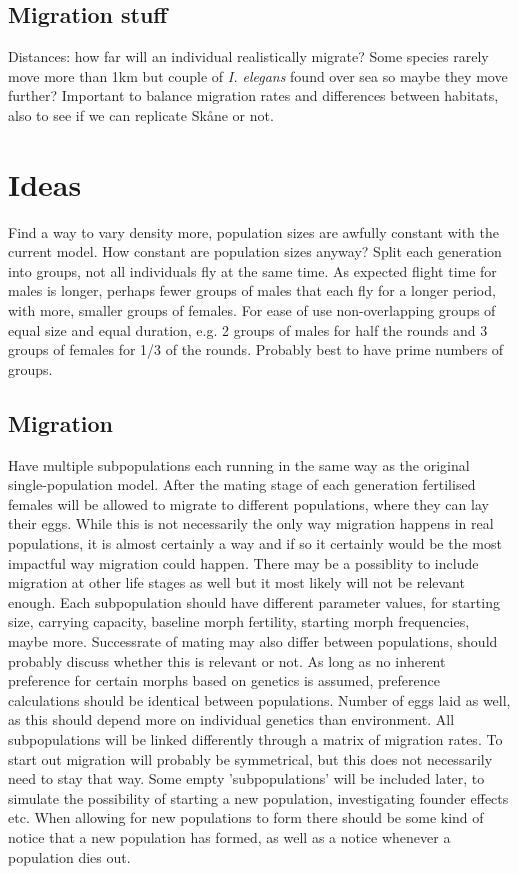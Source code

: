 \documentclass{article}
\begin{document}
\subsection{Migration stuff}
Distances: how far will an individual realistically migrate? Some species rarely move more than 1km but couple of \textit{I. elegans} found over sea so maybe they move further? Important to balance migration rates and differences between habitats, also to see if we can replicate Sk{\aa}ne or not.

\section{Ideas}
Find a way to vary density more, population sizes are awfully constant with the current model. How constant are population sizes anyway?
Split each generation into groups, not all individuals fly at the same time. As expected flight time for males is longer, perhaps fewer groups of males that each fly for a longer period, with more, smaller groups of females. For ease of use non-overlapping groups of equal size and equal duration, e.g. 2 groups of males for half the rounds and 3 groups of females for 1/3 of the rounds. Probably best to have prime numbers of groups.

\subsection{Migration}
Have multiple subpopulations each running in the same way as the original single-population model.
After the mating stage of each generation fertilised females will be allowed to migrate to different populations, where they can lay their eggs. While this is not necessarily the only way migration happens in real populations, it is almost certainly a way and if so it certainly would be the most impactful way migration could happen. There may be a possiblity to include migration at other life stages as well but it most likely will not be relevant enough.
Each subpopulation should have different parameter values, for starting size, carrying capacity, baseline morph fertility, starting morph frequencies, maybe more.
Successrate of mating may also differ between populations, should probably discuss whether this is relevant or not.
As long as no inherent preference for certain morphs based on genetics is assumed, preference calculations should be identical between populations. Number of eggs laid as well, as this should depend more on individual genetics than environment.
All subpopulations will be linked differently through a matrix of migration rates. To start out migration will probably be symmetrical, but this does not necessarily need to stay that way.
Some empty 'subpopulations' will be included later, to simulate the possibility of starting a new population, investigating founder effects etc.
When allowing for new populations to form there should be some kind of notice that a new population has formed, as well as a notice whenever a population dies out.
\end{document}

